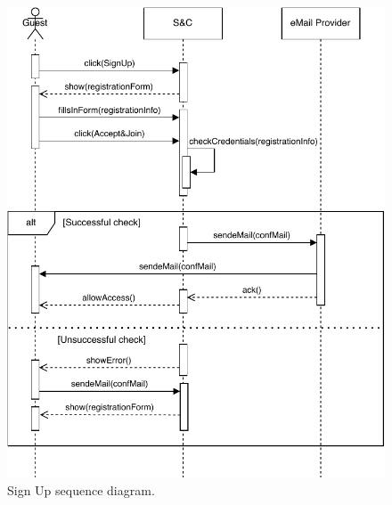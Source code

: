 \begin{figure}[H]
    \begin{center}
        \includegraphics[width=\linewidth, keepaspectratio]{Images/SequenceDiagram/SignUpSD.pdf}
        \caption{Sign Up sequence diagram.}
        \label{fig:sign_up_seqdiag}%
    \end{center}
\end{figure}


